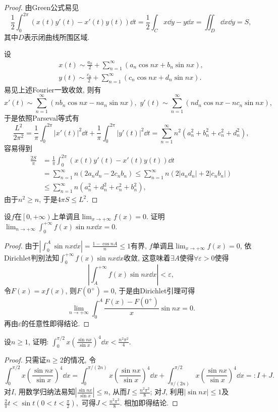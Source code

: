 \begin{quiza}
\begin{proof}
由Green公式易见\[\frac{1}{2}\int_{0}^{2\pi}\left(x(t)y'(t)-x'(t)y(t)\right)\dd t=\frac{1}{2}\int_Cx\dd y-y\dd x=\iint_{D}\dd x\dd y=S,\]其中\(D\)表示闭曲线所围区域.

设\begin{gather*}
x(t)\sim\frac{a_0}{2}+\sum_{n=1}^{\infty}\left(a_n\cos nx+b_n\sin nx\right),\\
y(t)\sim\frac{c_0}{2}+\sum_{n=1}^{\infty}\left(c_n\cos nx+d_n\sin nx\right).
\end{gather*}
易见上述Fourier一致收敛, 则有\[x'(t)\sim\sum_{n=1}^{\infty}\left(nb_n\cos nx-na_n\sin nx\right),\,\,y'(t)\sim\sum_{n=1}^{\infty}\left(nd_n\cos nx-nc_n\sin nx\right),\]于是依照Parseval等式有\[\frac{L^2}{2\pi^2}=\frac{1}{\pi}\int_{0}^{2\pi}|x'(t)|^2\dd t+\frac{1}{\pi}\int_{0}^{2\pi}|y'(t)|^2\dd t=\sum_{n=1}^{\infty}n^2\left(a_n^2+b_n^2+c_n^2+d_n^2\right),\]容易得到\[\begin{split}
\frac{2S}{\pi}&=\frac{1}{\pi}\int_{0}^{2\pi}\left(x(t)y'(t)-x'(t)y(t)\right)\dd t\\
&=\sum_{n=1}^{\infty}n\left(2a_nd_n-2c_nb_n\right)\leqslant\sum_{n=1}^{\infty}n\left(2|a_nd_n|+2|c_nb_n|\right)\\&\leqslant\sum_{n=1}^{\infty}n\left(a_n^2+d_n^2+c_n^2+b_n^2\right),
\end{split}\]由于\(n^2\geqslant n\), 于是\(4\pi S\leqslant L^2.\)
\end{proof}
\woe 设\(f\)在\(\left[0,+\infty\right)\)上单调且\(\lim_{x\rightarrow+\infty}f(x)=0\). 证明\(\lim_{n\rightarrow+\infty}\int_{0}^{+\infty}f(x)\sin nx\dd x=0.\)
\begin{proof}
由于\(\left|\int_{0}^{A}\sin nx\dd x\right|=\frac{1-\cos nA}{n}\leqslant 1\)有界, \(f\)单调且\(\lim_{x\rightarrow+\infty}f(x)=0\), 依Dirichlet判别法知\(\int_{0}^{+\infty}f(x)\sin nx\dd x\)收敛, 这意味着\(\exists A\)使得\(\forall\varepsilon>0\)使得\[\left|\int_{A}^{+\infty}f(x)\sin nx\dd x\right|<\varepsilon,\]令\(F(x)=xf(x)\), 则\(F(0^+)=0\), 于是由Dirichlet引理可得\[\lim_{n\rightarrow+\infty}\int_{0}^{A}\frac{F(x)-F(0^+)}{x}\sin nx=0.\]再由\(\varepsilon\)的任意性即得结论.
\end{proof}
\woe 设\(n\geqslant 1\), 证明: \(\int_{0}^{\pi/2}x\left(\frac{\sin nx}{\sin x}\right)^4\dd x<\frac{n^2\pi^2}{4}.\)
\begin{proof}
\def\r{\frac{\sin nx}{\sin x}}
只需证\(n\geqslant 2\)的情况, 令\[\int_{0}^{\pi/2}x\left(\r\right)^4\dd x=\int_{0}^{\pi/(2n)}x\left(\r\right)^4\dd x+\int_{\pi/(2n)}^{\pi/2}x\left(\r\right)^4\dd x=:I+J.\]
对\(I\), 用数学归纳法易知\(\left|\r\right|\leqslant n\), 从而\(I\leqslant\frac{n^2\pi^2}{8}\); 对\(J\), 利用\(|\sin nx|\leqslant 1\)及\(\frac{2}{\pi}t<\sin t\left(0< t< \frac{\pi}{2}\right),\) 可得\(J<\frac{n^2\pi^2}{8}\). 相加即得结论.

\end{proof}
\end{quiza}
